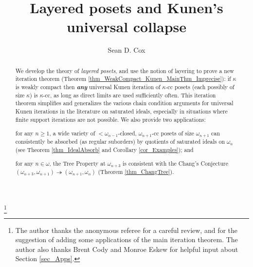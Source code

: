 \documentclass{amsart}
\begin{document}
\title[Layered posets and Kunen's universal collapse]{Layered posets and Kunen's universal collapse}




\author{Sean D. Cox}
\address{
Department of Mathematics and Applied Mathematics \\
Virginia Commonwealth University \\
1015 Floyd Avenue \\
Richmond, Virginia 23284, USA 
}


\thanks{The author thanks the anonymous referee for a careful review, and for the suggestion of adding some applications of the main iteration theorem.  The author also thanks Brent Cody and Monroe Eskew for helpful input about Section \ref{sec_Apps}.}






\begin{abstract}
We develop the theory of \emph{layered posets}, and  use the notion of layering to prove a new iteration theorem (Theorem \ref{thm_WeakCompact_Kunen_MainThm_Imprecise}): if $\kappa$ is weakly compact then \emph{\textbf{any}} universal Kunen iteration of $\kappa$-cc posets (each possibly of size $\kappa$) is $\kappa$-cc, as long as direct limits are used sufficiently often.  This iteration theorem simplifies and generalizes the various chain condition arguments for universal Kunen iterations in the literature on saturated ideals, especially in situations where finite support iterations are not possible.  We also  provide two applications: 
\begin{enumerate*}
 \item for any $n \ge 1$, a wide variety of $<\omega_{n-1}$-closed, $\omega_{n+1}$-cc posets of size $\omega_{n+1}$ can consistently be absorbed (as regular suborders) by quotients of saturated ideals on $\omega_n$ (see Theorem \ref{thm_IdealAbsorb} and Corollary \ref{cor_Examples}); and 
 \item for any $n \in \omega$, the Tree Property at $\omega_{n+3}$ is consistent with the Chang's Conjecture $(\omega_{n+3}, \omega_{n+1}) \twoheadrightarrow (\omega_{n+1}, \omega_n)$ (Theorem \ref{thm_ChangTree}).  
\end{enumerate*}
\end{abstract}

\maketitle
\end{document}
